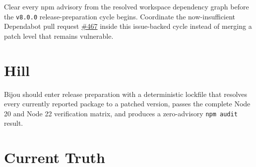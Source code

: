 Clear every npm advisory from the resolved workspace dependency graph before the \texttt{v\allowbreak{}8\allowbreak{}.\allowbreak{}0\allowbreak{}.\allowbreak{}0} release-preparation cycle begins. Coordinate the now-insufficient Dependabot pull request \href{https://github.com/flyingrobots/bijou/pull/467}{\#467} inside this issue-backed cycle instead of merging a patch level that remains vulnerable.

\section{Hill}\label{record-248-hill}

Bijou should enter release preparation with a deterministic lockfile that resolves every currently reported package to a patched version, passes the complete Node 20 and Node 22 verification matrix, and produces a zero-advisory \texttt{n\allowbreak{}p\allowbreak{}m\allowbreak{} \allowbreak{}a\allowbreak{}u\allowbreak{}d\allowbreak{}i\allowbreak{}t} result.

\section{Current Truth}\label{record-248-current-truth}

